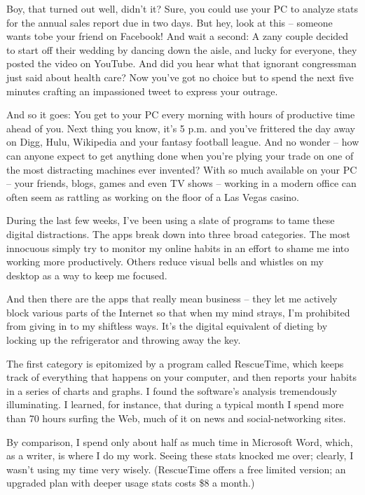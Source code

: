 ﻿\documentclass[12pt]{article}
\begin{document}
Boy, that turned out well, didn't it? Sure, you could use your PC to analyze stats for the annual
sales report due in two days. But hey, look at this -- someone wants tobe your friend on Facebook!
And wait a second: A zany couple decided to start off their wedding by dancing down the aisle, and
lucky for everyone, they posted the video on YouTube. And did you hear what that ignorant
congressman just said about health care? Now you've got no choice but to spend the next five minutes
crafting an impassioned tweet to express your outrage.

And so it goes: You get to your PC every morning with hours of productive time ahead of you. Next
thing you know, it's 5 p.m. and you've frittered the day away on Digg, Hulu, Wikipedia and your
fantasy football league. And no wonder -- how can anyone expect to get anything done when you're
plying your trade on one of the most distracting machines ever invented? With so much available on
your PC -- your friends, blogs, games and even TV shows -- working in a modern office can often seem
as rattling as working on the floor of a Las Vegas casino.

During the last few weeks, I've been using a slate of programs to tame these digital distractions.
The apps break down into three broad categories. The most innocuous simply try to monitor my online
habits in an effort to shame me into working more productively. Others reduce visual bells and
whistles on my desktop as a way to keep me focused.

And then there are the apps that really mean business -- they let me actively block various parts of
the Internet so that when my mind strays, I'm prohibited from giving in to my shiftless ways. It's
the digital equivalent of dieting by locking up the refrigerator and throwing away the key.

The first category is epitomized by a program called RescueTime, which keeps track of everything
that happens on your computer, and then reports your habits in a series of charts and graphs. I
found the software's analysis tremendously illuminating. I learned, for instance, that during a
typical month I spend more than 70 hours surfing the Web, much of it on news and social-networking
sites.

By comparison, I spend only about half as much time in Microsoft Word, which, as a writer, is where
I do my work. Seeing these stats knocked me over; clearly, I wasn't using my time very wisely.
(RescueTime offers a free limited version; an upgraded plan with deeper usage stats costs \$8 a
month.)
\end{document}

